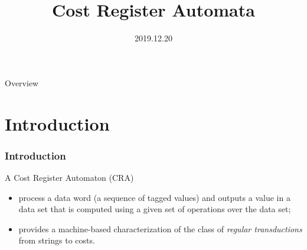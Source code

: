 \documentclass[landscape]{beamer}
\title{Cost Register Automata}
\date{2019.12.20}
\begin{document}
\frame{\titlepage}

\begin{frame}{Overview}
    \tableofcontents
\end{frame}

\section{Introduction}
\begin{frame}
\frametitle{Introduction}
\begin{block}{A Cost Register Automaton (CRA)}
\begin{itemize}
    \item process a data word (a sequence of tagged values)
        and outputs a value in a data set
        that is computed using a given set of operations over the data set;
    \item provides a machine-based characterization
    of the class of \textit{regular transductions} from strings to costs.
\end{itemize}
\end{block}
\end{frame}
\end{document}
